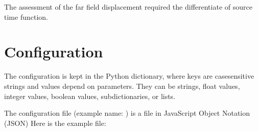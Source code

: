 \documentclass[letterpaper,10pt,english]{sphinxmanual}
\begin{document}
\sphinxAtStartPar
The assessment of the far field displacement required the differentiate
of source time function.

\sphinxstepscope


\chapter{Configuration}
\label{\detokenize{configuration:configuration}}\label{\detokenize{configuration:configuration-head}}\label{\detokenize{configuration::doc}}
\sphinxAtStartPar
The configuration is kept in the Python dictionary,
where keys are case\sphinxhyphen{}sensitive strings and values depend on parameters.
They can be strings, float values, integer values, boolean values, sub\sphinxhyphen{}dictionaries, or lists.

\sphinxAtStartPar
The configuration file (example name: ) is a file in JavaScript Object Notation (JSON)
Here is the example file:
\end{document}
